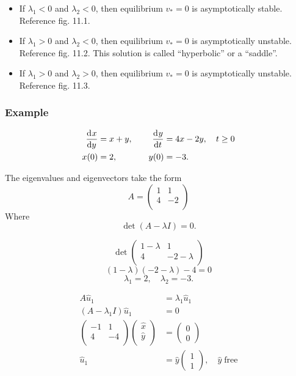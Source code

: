 \documentclass[12pt,twoside]{article}
\begin{document}
\begin{itemize}
\item If $\lambda_1<0$ and $\lambda_2<0$, then equilibrium $v_*=0$ is
  asymptotically stable. Reference fig. 11.1.
\item If $\lambda_1>0$ and $\lambda_2<0$, then equilibrium $v_*=0$ is
  asymptotically unstable. Reference fig. 11.2. This solution is called
  ``hyperbolic'' or a ``saddle''.
\item If $\lambda_1>0$ and $\lambda_2>0$, then equilibrium $v_*=0$ is
  asymptotically unstable. Reference fig. 11.3.
\end{itemize}

\subsubsection{Example}
\begin{equation}
  \begin{aligned}
    \frac{\mathrm{d}^{} {x}}{\mathrm{d}{y}^{}} &= x+y,\quad& \frac{\mathrm{d}^{} {y}}{\mathrm{d}{t}^{}} &=4x-2y, \quad t\ge0 \\
    x(0) &= 2, \quad& y(0) &= -3.
  \end{aligned}
\end{equation}

The eigenvalues and eigenvectors take the form
$$A = \begin{pmatrix} 1 & 1 \\ 4 & -2 \\ \end{pmatrix}$$
Where $$\det(A-\lambda I)=0.$$

\begin{equation}
  \det \begin{pmatrix}
    1-\lambda & 1 \\
    4 & -2-\lambda \\
  \end{pmatrix}
\end{equation}
$$(1-\lambda)(-2-\lambda)-4=0$$
$$\lambda_1=2,\quad \lambda_2=-3.$$

\begin{equation}
  \begin{aligned}
    A\hat{u}_1 &= \lambda_1\hat{u}_1 \\
    (A-\lambda_1I)\hat{u}_1 &= 0 \\
    \begin{pmatrix}
      -1 & 1 \\ 4 & -4 \\
    \end{pmatrix}
    \begin{pmatrix}
      \hat{x} \\ \hat{y} \\
    \end{pmatrix} &=
    \begin{pmatrix}
      0 \\ 0
    \end{pmatrix} \\
    \hat{u}_1 &= \hat{y}
    \begin{pmatrix}
      1 \\ 1
    \end{pmatrix}, \quad \hat{y}\;\text{free}
  \end{aligned}
\end{equation}
\end{document}
